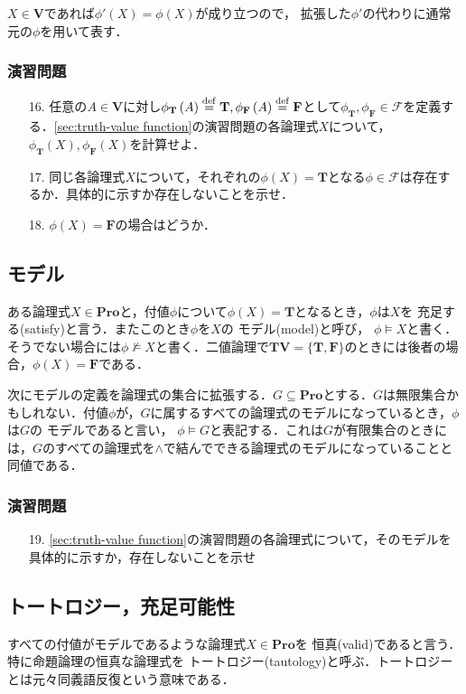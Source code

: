 \documentclass{ltjsarticle}
\theoremstyle{mystyle1}
\theoremstyle{mystyle2}
\newcommand{\bT}{\ensuremath{\mathbf{T}}}
\newcommand{\bF}{\ensuremath{\mathbf{F}}}
\newcommand{\bV}{\ensuremath{\mathbf{V}}}
\newcommand{\bPro}{\ensuremath{\mathbf{Pro}}}
\newcommand{\cF}{\ensuremath{\mathcal{F}}}
\newcommand{\dequal}{\ensuremath{\stackrel{\rm{def}}{=}}}
\newcommand{\red}[1]{{\color{red} #1}}
\begin{document}
$X\in\bV$であれば$\phi'\left(X\right) =\phi\left(X\right)$が成り立つので， 拡張した$\phi'$の代わりに通常元の$\phi$を用いて表す．
\subsubsection*{演習問題}
\begin{enumerate}
  \item[16.] 任意の$A\in\bV$に対し$\phi_\bT\left(A\right)\dequal\bT,\phi_\bF\left(A\right)\dequal\bF$として$\phi_\bT,\phi_\bF\in\cF$を定義する．\ref{sec:truth-value function}の演習問題の各論理式$X$について，$\phi_\bT\left(X\right),\phi_\bF\left(X\right)$を計算せよ．
  \item[17.] 同じ各論理式$X$について，それぞれの$\phi\left(X\right)=\bT$となる$\phi\in\cF$は存在するか．具体的に示すか存在しないことを示せ．
  \item[18.] $\phi\left(X\right)=\bF$の場合はどうか．
\end{enumerate}
\subsection{モデル}
ある論理式$X\in\bPro$と，付値$\phi$について$\phi\left(X\right)=\bT$となるとき，$\phi$は$X$を\red{充足する}(satisfy)と言う．またこのとき$\phi$を$X$の\red{モデル}(model)と呼び，\red{$\phi\models X$}と書く．そうでない場合には$\phi\not\models X$と書く．二値論理で$\bT\bV = \{\bT, \bF\}$のときには後者の場合，$\phi\left(X\right) = \bF$である．

次にモデルの定義を論理式の集合に拡張する．$G\subseteq\bPro$とする．$G$は無限集合かもしれない．付値$\phi$が，$G$に属するすべての論理式のモデルになっているとき，$\phi$は$G$の\red{モデル}であると言い，\red{$\phi\models G$}と表記する．これは$G$が有限集合のときには，$G$のすべての論理式を$\wedge$で結んでできる論理式のモデルになっていることと同値である．
\subsubsection*{演習問題}
\begin{enumerate}
  \item[19.]\ref{sec:truth-value function}の演習問題の各論理式について，そのモデルを具体的に示すか，存在しないことを示せ
\end{enumerate}
\subsection{トートロジー，充足可能性}
すべての付値がモデルであるような論理式$X\in\bPro$を\red{恒真}(valid)であると言う．特に命題論理の恒真な論理式を\red{トートロジー}(tautology)と呼ぶ．トートロジーとは元々同義語反復という意味である．
\end{document}
